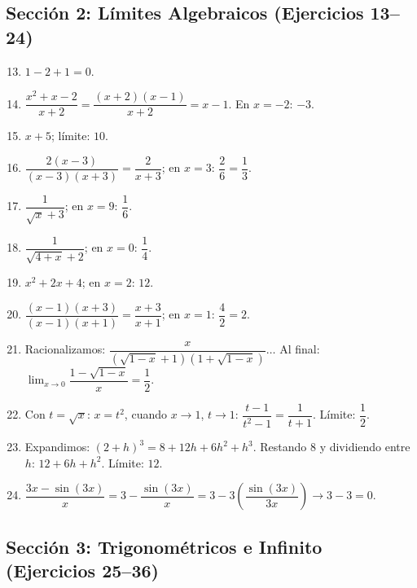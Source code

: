 \documentclass[12pt, a4paper]{article}
\begin{document}
\subsection*{Sección 2: Límites Algebraicos (Ejercicios 13--24)}

\begin{enumerate}[leftmargin=*, label=\textbf{\arabic*.}]
  \setcounter{enumi}{12}
  \item $1 - 2 + 1 = 0$.

  \item $\dfrac{x^2 + x - 2}{x + 2} = \dfrac{(x + 2)(x - 1)}{x + 2} = x - 1$. En $x = -2$: $-3$.

  \item $x + 5$; límite: $10$.

  \item $\dfrac{2(x - 3)}{(x - 3)(x + 3)} = \dfrac{2}{x + 3}$; en $x = 3$: $\dfrac{2}{6} = \dfrac{1}{3}$.

  \item $\dfrac{1}{\sqrt{x} + 3}$; en $x = 9$: $\dfrac{1}{6}$.

  \item $\dfrac{1}{\sqrt{4 + x} + 2}$; en $x = 0$: $\dfrac{1}{4}$.

  \item $x^2 + 2x + 4$; en $x = 2$: $12$.

  \item $\dfrac{(x - 1)(x + 3)}{(x - 1)(x + 1)} = \dfrac{x + 3}{x + 1}$; en $x = 1$: $\dfrac{4}{2} = 2$.

  \item Racionalizamos: $\dfrac{x}{(\sqrt{1 - x} + 1)(1 + \sqrt{1-x})} \dots$ Al final: $\lim_{x \to 0} \dfrac{1 - \sqrt{1 - x}}{x} = \dfrac{1}{2}$.

  \item Con $t = \sqrt{x}$: $x = t^2$, cuando $x \to 1$, $t \to 1$: $\dfrac{t - 1}{t^2 - 1} = \dfrac{1}{t + 1}$. Límite: $\dfrac{1}{2}$.

  \item Expandimos: $(2 + h)^3 = 8 + 12h + 6h^2 + h^3$. Restando 8 y dividiendo entre $h$: $12 + 6h + h^2$. Límite: $12$.

  \item $\dfrac{3x - \sin(3x)}{x} = 3 - \dfrac{\sin(3x)}{x} = 3 - 3\left(\dfrac{\sin(3x)}{3x}\right) \to 3 - 3 = 0$.
\end{enumerate}

\subsection*{Sección 3: Trigonométricos e Infinito (Ejercicios 25--36)}
\end{document}
